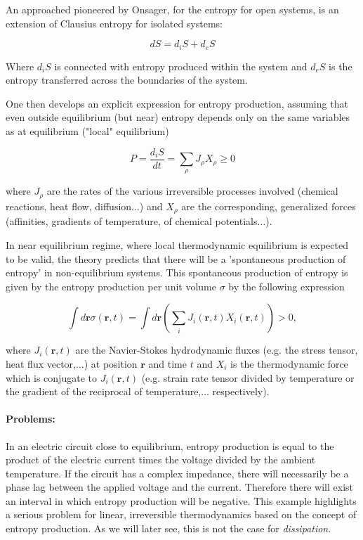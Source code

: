 \documentclass[a4paper,12pt]{article}
\begin{document}
An approached pioneered by Onsager, for the entropy for open systems, is an extension of Clausius entropy for isolated systems:

\begin{equation}
  	dS=d_iS+d_eS
\end{equation}

Where $d_iS$ is connected with entropy produced within the system and $d_eS$ is the entropy transferred across the boundaries of the system.

One then develops an explicit expression for entropy production, assuming that even outside equilibrium (but near) entropy depends only on the same
variables as at equilibrium ("local" equilibrium)

\begin{equation}
  	P=\frac{d_iS}{dt}=\sum _{\rho } J_{\rho }X_{\rho }\geq 0
\end{equation}

where \(J_{\rho }\) are the rates of the various irreversible processes involved (chemical reactions, heat flow, diffusion$\ldots $) and \(X_{\rho
}\) are the corresponding, generalized forces (affinities, gradients of temperature, of chemical potentials$\ldots $).


In near equilibrium regime, where local thermodynamic equilibrium is expected to be valid, the theory predicts that there will be a 'spontaneous production of entropy' in non-equilibrium systems.
This spontaneous production of entropy is given by the entropy production per unit volume $\sigma$ by the following expression \cite{DeGroot:2013ue}

\begin{equation}
    \int d\bm{r} \sigma(\bm{r},t)=\int d\bm{r}(\sum_i J_i(\bm{r},t)X_i(\bm{r},t))>0,
\end{equation}

where $J_i(\bm{r},t)$ are the Navier-Stokes hydrodynamic fluxes (e.g. the stress tensor, heat flux vector,...) at position $\bm{r}$ and time $t$ and $X_i$ is the thermodynamic force which is conjugate to $J_i(\bm{r},t)$ (e.g. strain rate tensor divided by temperature or the gradient of the reciprocal of temperature,... respectively).

\paragraph{Problems:}
In an electric circuit close to equilibrium, entropy production is equal to the product of the electric current times the voltage divided by the ambient temperature. If the circuit has a complex impedance, there will necessarily be a phase lag between the applied voltage and the current. Therefore there will exist an interval in which entropy production will be negative. 
This example highlights a serious problem for linear, irreversible thermodynamics based on the concept of entropy production. As we will later see, this is not the case for \textit{dissipation}.
\end{document}

